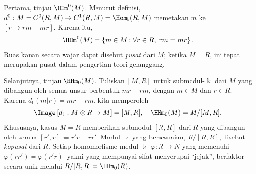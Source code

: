 \begin{contoh}
	Pertama, tinjau $\HHm^0(M)$. Menurut definisi,
	$d^0:M=C^0(R,M)\to C^1(R,M)=\Hom_{\Bbbk}(R,M)$ memetakan $m$ ke
	$[r\mapsto rm-mr]$. Karena itu,
	\[ \HHm^0(M)=\left\{m\in M:\forall r\in R,\;rm=mr\right\}. \]
	Ruas kanan secara wajar dapat disebut \emph{pusat} dari $M$; ketika
	$M=R$, ini tepat merupakan pusat dalam pengertian teori gelanggang.

	Selanjutnya, tinjau $\HHm_0(M)$. Tuliskan $[M,R]$ untuk submodul-$\Bbbk$
	dari $M$ yang dibangun oleh semua unsur berbentuk $mr-rm$, dengan
	$m\in M$ dan $r\in R$. Karena $d_1(m|r)=mr-rm$, kita memperoleh
	\[ \Image\left[d_1:M\otimes R\to M\right]=[M,R],
		\quad \HHm_0(M)=M/[M,R]. \]
	Khususnya, kasus $M=R$ memberikan submodul $[R,R]$ dari $R$ yang
	dibangun oleh semua $[r',r]:=r'r-rr'$. Modul-$\Bbbk$ yang bersesuaian,
	$R/[R,R]$, disebut \emph{kopusat} dari $R$. Setiap homomorfisme
	modul-$\Bbbk$ $\varphi:R\to N$ yang memenuhi
	$\varphi(rr')=\varphi(r'r)$, yakni yang mempunyai sifat menyerupai
	``jejak'', berfaktor secara unik melalui
	$R/[R,R]=\HHm_0(R)$.
\end{contoh}

